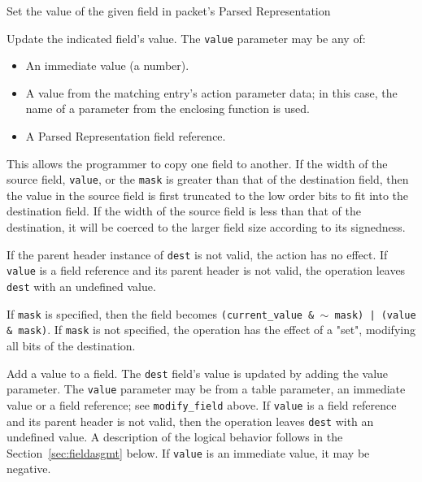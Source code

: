 \documentclass[12pt]{article}
\begin{document}
{ %
Set the value of the given field in packet's Parsed Representation
}
{ %
}
{ %
Update the indicated field's value. The \texttt{value} parameter may be any of:

\begin{itemize}
\item
An immediate value (a number).
\item
A value from the matching entry's action parameter data; in this case, the
name of a parameter from the enclosing function is used.
\item
A Parsed Representation field reference.
\end{itemize}


This allows the programmer to copy one field to another. If the width of
the source field, \texttt{value}, or the \texttt{mask} is greater than that of the destination
field, then the value in the source field is first truncated to the low order
bits to fit into the destination field. If the width of the source field
is less than that of the destination, it will be coerced to the larger field
size according to its signedness.

If the parent header instance of \texttt{dest} is not valid, the action has no effect.
If \texttt{value} is a field reference and its parent header is not valid, the operation leaves \texttt{dest} with an undefined value.

If \texttt{mask} is specified, then the field becomes \texttt{(current_value \& $\sim$ mask) |
(value \& mask)}.  If \texttt{mask} is not specified, the operation has the effect
of a "set", modifying all bits of the destination.

}


{ %
Add a value to a field.
}
{ %
}
{ %
The \texttt{dest} field's value is updated by adding the value parameter. The \texttt{value} parameter
may be from a table parameter, an immediate value or a field reference; see \texttt{modify_field} above.  If \texttt{value} is a field reference
and its parent header is not valid, then the operation leaves \texttt{dest} with an undefined value. A description
of the logical behavior follows in the Section~\ref{sec:fieldasgmt} below.
If \texttt{value} is an immediate value, it may
be negative.
}
\end{document}

